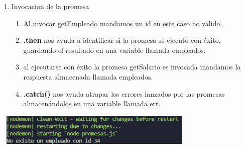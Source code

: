 \documentclass{report}
\begin{document}
\begin{enumerate}
\begin{enumerate}
  \end{enumerate}
  \item Invocacion de la promesa
  
  \begin{enumerate}
    \item Al invocar getEmpleado mandamos un id en este caso no valido.
    \item \textbf{.then} nos ayuda a identificar si la promesa se ejecutó con éxito, guardando el resultado en una variable llamada empleados.
    \item al ejecutarse con éxito la promesa getSalario es invocada mandamos la respuesta almacenada llamada empleados.
    \item \textbf{.catch()} nos ayuda atrapar los errores lanzados por las promesas almacenándolos en una variable llamada err.
  \end{enumerate}
\end{enumerate}
\begin{center}
  \includegraphics[width=10cm, height=1.5cm]{11.PNG}
\end{center}
\end{document}
